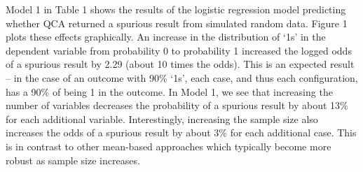 \documentclass[12pt]{article}
\begin{document}
{Model 1 in Table 1 shows the results of the logistic regression model predicting whether QCA returned a spurious result from simulated random data. Figure 1 plots these effects graphically. An increase in the distribution of `1s' in the dependent variable from probability 0 to probability 1 increased the logged odds of a spurious result by 2.29 (about 10 times the odds). This is an expected result -- in the case of an outcome with 90\% `1s', each case, and thus each configuration, has a 90\% of being 1 in the outcome. In Model 1, we see that increasing the number of variables decreases the probability of a spurious result by about 13\% for each additional variable. Interestingly, increasing the sample size also increases the odds of a spurious result by about 3\% for each additional case. This is in contrast to other mean-based approaches which typically become more robust as sample size increases.

}
\end{document}
